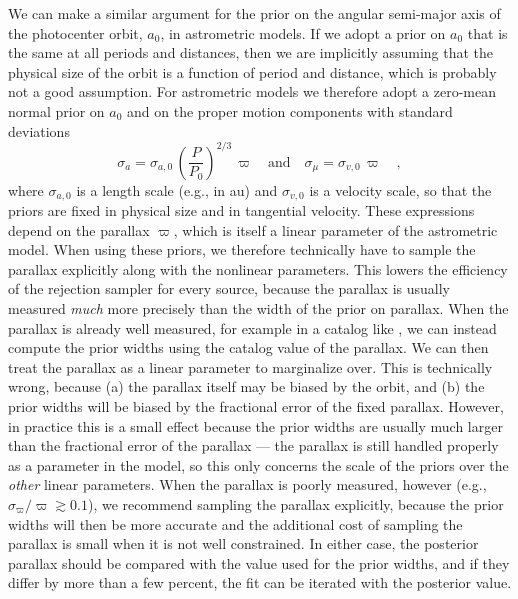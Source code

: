 \documentclass[twocolumn]{AASTeX7/aastex701}
\begin{document}
We can make a similar argument for the prior on the angular semi-major axis of the
photocenter orbit, $a_0$, in astrometric models.
If we adopt a prior on $a_0$ that is the same at all periods and distances, then we are
implicitly assuming that the physical size of the orbit is a function of period and
distance, which is probably not a good assumption.
For astrometric models we therefore adopt a zero-mean normal prior on $a_0$ and on
the proper motion components with standard deviations
\begin{equation}
  \sigma_{a} = \sigma_{a,0}\,\left(\frac{P}{P_0}\right)^{2/3}\,\varpi
  \quad \mathrm{and} \quad
  \sigma_\mu = \sigma_{v,0}\,\varpi
  \quad ,
  \label{eq:sigma-a}
\end{equation}
where $\sigma_{a,0}$ is a length scale (e.g., in \unit{au}) and
$\sigma_{v,0}$ is a velocity scale, so that the priors are fixed in physical size and in
tangential velocity.
These expressions depend on the parallax $\varpi$, which is itself a linear parameter
of the astrometric model.
When using these priors, we therefore technically have to sample the parallax explicitly
along with the nonlinear parameters.
This lowers the efficiency of the rejection sampler for every source, because the
parallax is usually measured \emph{much} more precisely than the width of the prior on
parallax.
When the parallax is already well measured, for example in a catalog like \gaia, we
can instead compute the prior widths using the catalog value of the parallax.
We can then treat the parallax as a linear parameter to marginalize over.
This is technically wrong, because (a) the parallax itself may be biased by the orbit,
and (b) the prior widths will be biased by the fractional error of the fixed parallax.
However, in practice this is a small effect because the prior widths are usually much
larger than the fractional error of the parallax --- the parallax is still handled
properly as a parameter in the model, so this only concerns the scale of the priors over
the \emph{other} linear parameters.
When the parallax is poorly measured, however (e.g., $\sigma_\varpi/\varpi \gtrsim
0.1$), we recommend sampling the parallax explicitly, because the prior widths will then
be more accurate and the additional cost of sampling the parallax is small when it
is not well constrained.
In either case, the posterior parallax should be compared with the value used for the
prior widths, and if they differ by more than a few percent, the fit can be iterated
with the posterior value.


\end{document}
